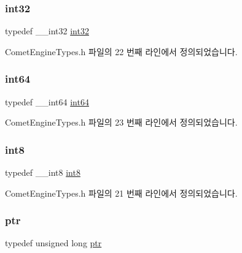 \subsubsection{\texorpdfstring{int32}{int32}}
{\footnotesize\ttfamily typedef \+\_\+\+\_\+int32 \hyperlink{namespace_comet_engine_1_1_type_ad3ce9f24199b79b2629169eebf59489b}{int32}}



Comet\+Engine\+Types.\+h 파일의 22 번째 라인에서 정의되었습니다.

\mbox{\label{namespace_comet_engine_1_1_type_a92a47ab0e245f0ae4d01c38a64b6c427}} 
\subsubsection{\texorpdfstring{int64}{int64}}
{\footnotesize\ttfamily typedef \+\_\+\+\_\+int64 \hyperlink{namespace_comet_engine_1_1_type_a92a47ab0e245f0ae4d01c38a64b6c427}{int64}}



Comet\+Engine\+Types.\+h 파일의 23 번째 라인에서 정의되었습니다.

\mbox{\label{namespace_comet_engine_1_1_type_aaf44e46c719bc25ff3de1341e7aa4094}} 
\subsubsection{\texorpdfstring{int8}{int8}}
{\footnotesize\ttfamily typedef \+\_\+\+\_\+int8 \hyperlink{namespace_comet_engine_1_1_type_aaf44e46c719bc25ff3de1341e7aa4094}{int8}}



Comet\+Engine\+Types.\+h 파일의 21 번째 라인에서 정의되었습니다.

\mbox{\label{namespace_comet_engine_1_1_type_aeb22ad46de677e9a50679dfebeb0e6f0}} 
\subsubsection{\texorpdfstring{ptr}{ptr}}
{\footnotesize\ttfamily typedef unsigned long \hyperlink{namespace_comet_engine_1_1_type_aeb22ad46de677e9a50679dfebeb0e6f0}{ptr}}



